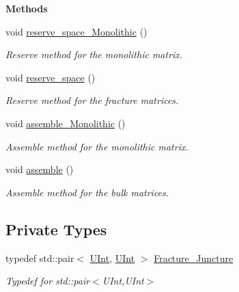 \begin{Indent}{\bf Methods}\par
\begin{DoxyCompactItemize}
\item 
void \hyperlink{classFVCode3D_1_1FractureBuilder_af3f7ade53f75d44dbb523b697bced516}{reserve\+\_\+space\+\_\+\+Monolithic} ()
\begin{DoxyCompactList}\small\item\em Reserve method for the monolithic matrix. \end{DoxyCompactList}\item 
void \hyperlink{classFVCode3D_1_1FractureBuilder_a27a2975168100bcf35373b4715d8b1dc}{reserve\+\_\+space} ()
\begin{DoxyCompactList}\small\item\em Reserve method for the fracture matrices. \end{DoxyCompactList}\item 
void \hyperlink{classFVCode3D_1_1FractureBuilder_a8aa6db02f37b5fdd9d9a86b2ca6b1fcf}{assemble\+\_\+\+Monolithic} ()
\begin{DoxyCompactList}\small\item\em Assemble method for the monolithic matrix. \end{DoxyCompactList}\item 
void \hyperlink{classFVCode3D_1_1FractureBuilder_ab24549851fa577aa8d6cba68fd970d75}{assemble} ()
\begin{DoxyCompactList}\small\item\em Assemble method for the bulk matrices. \end{DoxyCompactList}\end{DoxyCompactItemize}
\end{Indent}
\subsection*{Private Types}
\begin{DoxyCompactItemize}
\item 
typedef std\+::pair$<$ \hyperlink{namespaceFVCode3D_a4bf7e328c75d0fd504050d040ebe9eda}{U\+Int}, \hyperlink{namespaceFVCode3D_a4bf7e328c75d0fd504050d040ebe9eda}{U\+Int} $>$ \hyperlink{classFVCode3D_1_1FractureBuilder_a12e64420f8c1478beec1e5900577a915}{Fracture\+\_\+\+Juncture}
\begin{DoxyCompactList}\small\item\em Typedef for std\+::pair$<$\+U\+Int,\+U\+Int$>$ \end{DoxyCompactList}\end{DoxyCompactItemize}
